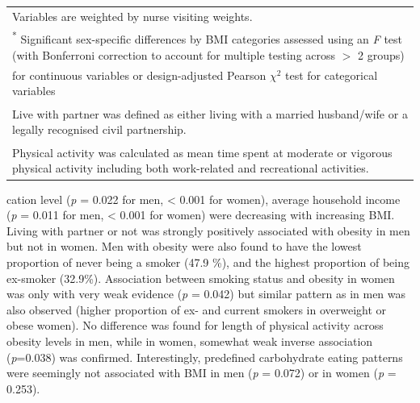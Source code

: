 \begin{table}
\begin{tabular}[t]{lcccccccc}
			\multicolumn{9}{l}{{\scriptsize Variables are weighted by nurse visiting weights.}}\\
			\multicolumn{9}{l}{{\scriptsize \textsuperscript{*} Significant sex-specific differences by BMI categories assessed using an \textit{F} test (with Bonferroni correction to account for multiple testing across $>$ 2 groups)}} \\ 
			\multicolumn{9}{l}{{\scriptsize for continuous variables or design-adjusted Pearson $\chi^2$ test for categorical variables}}\\
			\multicolumn{9}{l}{{\scriptsize \textsuperscript{\ddag} Live with partner was defined as either living with a married husband/wife or a legally recognised civil partnership.}}\\
			\multicolumn{9}{l}{{\scriptsize \textsuperscript{\dag} Physical activity was calculated as mean time spent at moderate or vigorous physical activity including both work-related and recreational activities.}}\\
		\end{tabular}
	
\end{table}

cation level (\textit{p} = 0.022 for men, < 0.001 for women), average household income (\textit{p} = 0.011 for men, < 0.001 for women) were decreasing with increasing BMI. Living with partner or not was strongly positively associated with obesity in men but not in women. Men with obesity were also found to have the lowest proportion of never being a smoker (47.9 \%), and the highest proportion of being ex-smoker (32.9\%). Association between smoking status and obesity in women was only with very weak evidence (\textit{p} = 0.042) but similar pattern as in men was also observed (higher proportion of ex- and current smokers in overweight or obese women). No difference was found for length of physical activity across obesity levels in men, while in women, somewhat weak inverse association (\textit{p}=0.038) was confirmed. Interestingly, predefined carbohydrate eating patterns were seemingly not associated with BMI in men (\textit{p} = 0.072) or in women (\textit{p} = 0.253). 


